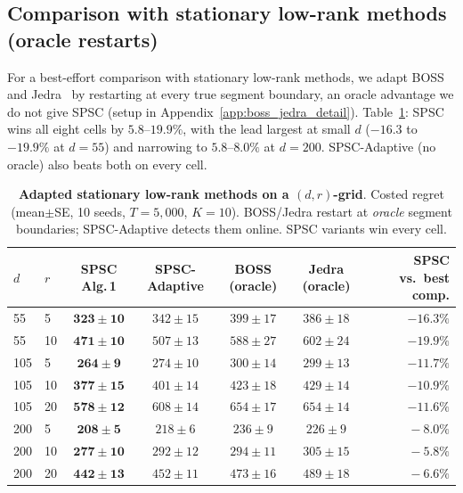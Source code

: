 \documentclass{article}
\begin{document}
\subsection{Comparison with stationary low-rank methods (oracle restarts)}
\label{sec:exp_boss_jedra}

For a best-effort comparison with stationary low-rank methods, we
adapt BOSS~\citep{duong2024beyond} and Jedra~\citep{jedra2024low} by
restarting at every true segment boundary, an oracle advantage we do
not give SPSC (setup in Appendix~\ref{app:boss_jedra_detail}).
Table~\ref{tab:boss_jedra_grid}: SPSC wins all eight cells by
$5.8$--$19.9\%$, with the lead largest at small $d$ ($-16.3$ to
$-19.9\%$ at $d{=}55$) and narrowing to $5.8$--$8.0\%$ at $d{=}200$.
SPSC-Adaptive (no oracle) also beats both on every cell.

\begin{table}[!htbp]
\centering
\caption{\textbf{Adapted stationary low-rank methods on a $(d,r)$-grid}.
Costed regret (mean$\pm$SE, 10 seeds, $T{=}5{,}000$, $K{=}10$). BOSS/Jedra restart at \emph{oracle} segment boundaries;
SPSC-Adaptive detects them online. SPSC variants win every cell.}
\label{tab:boss_jedra_grid}
\small
\setlength{\tabcolsep}{4pt}
\begin{tabular}{ll cccc r}
\toprule
$d$ & $r$ & SPSC Alg.\,1 & SPSC-Adaptive & BOSS (oracle) & Jedra (oracle) & SPSC vs.\ best comp.\\
\midrule
55  & 5   & $\mathbf{323\pm10}$ & $342\pm15$         & $399\pm17$         & $386\pm18$         & $-16.3\%$ \\
55  & 10  & $\mathbf{471\pm10}$ & $507\pm13$         & $588\pm27$         & $602\pm24$         & $-19.9\%$ \\
105 & 5   & $\mathbf{264\pm 9}$ & $274\pm10$         & $300\pm14$         & $299\pm13$         & $-11.7\%$ \\
105 & 10  & $\mathbf{377\pm15}$ & $401\pm14$         & $423\pm18$         & $429\pm14$         & $-10.9\%$ \\
105 & 20  & $\mathbf{578\pm12}$ & $608\pm14$         & $654\pm17$         & $654\pm14$         & $-11.6\%$ \\
200 & 5   & $\mathbf{208\pm 5}$ & $218\pm 6$         & $236\pm 9$         & $226\pm 9$         & $\phantom{-}-8.0\%$ \\
200 & 10  & $\mathbf{277\pm10}$ & $292\pm12$         & $294\pm11$         & $305\pm15$         & $\phantom{-}-5.8\%$ \\
200 & 20  & $\mathbf{442\pm13}$ & $452\pm11$         & $473\pm16$         & $489\pm18$         & $\phantom{-}-6.6\%$ \\
\bottomrule
\end{tabular}
\end{table}
\end{document}
